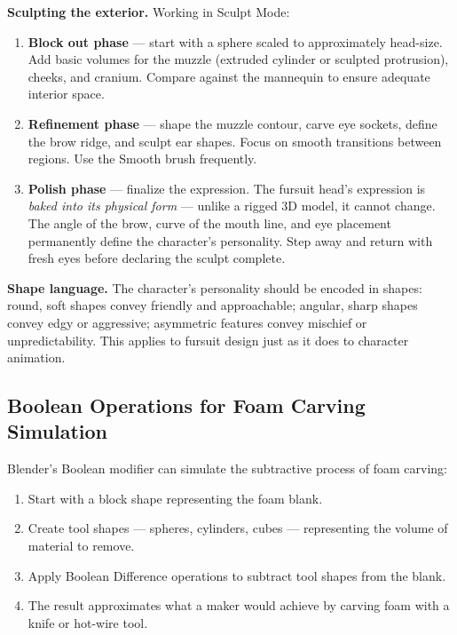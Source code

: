 \textbf{Sculpting the exterior.} Working in Sculpt Mode:

\begin{enumerate}[leftmargin=2em]
  \item \textbf{Block out phase} --- start with a sphere scaled to approximately head-size. Add basic volumes for the muzzle (extruded cylinder or sculpted protrusion), cheeks, and cranium. Compare against the mannequin to ensure adequate interior space.
  \item \textbf{Refinement phase} --- shape the muzzle contour, carve eye sockets, define the brow ridge, and sculpt ear shapes. Focus on smooth transitions between regions. Use the Smooth brush frequently.
  \item \textbf{Polish phase} --- finalize the expression. The fursuit head's expression is \emph{baked into its physical form} --- unlike a rigged 3D model, it cannot change. The angle of the brow, curve of the mouth line, and eye placement permanently define the character's personality. Step away and return with fresh eyes before declaring the sculpt complete.
\end{enumerate}

\begin{tipbox}
\textbf{Shape language.} The character's personality should be encoded in shapes: round, soft shapes convey friendly and approachable; angular, sharp shapes convey edgy or aggressive; asymmetric features convey mischief or unpredictability. This applies to fursuit design just as it does to character animation.
\end{tipbox}


\subsection{Boolean Operations for Foam Carving Simulation}

Blender's Boolean modifier can simulate the subtractive process of foam carving:

\begin{enumerate}[leftmargin=2em]
  \item Start with a block shape representing the foam blank.
  \item Create tool shapes --- spheres, cylinders, cubes --- representing the volume of material to remove.
  \item Apply Boolean Difference operations to subtract tool shapes from the blank.
  \item The result approximates what a maker would achieve by carving foam with a knife or hot-wire tool.
\end{enumerate}

